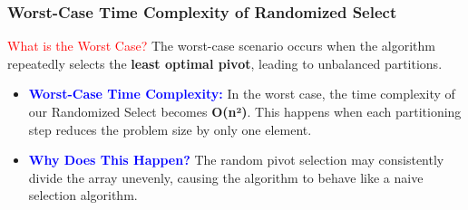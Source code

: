 \begin{frame}
    \frametitle{Worst-Case Time Complexity of Randomized Select}
    \vspace{0.4cm} %

    \begin{block}{\textcolor{red}{What is the Worst Case?}}
        The worst-case scenario occurs when the algorithm repeatedly selects the \textbf{least optimal pivot}, leading to unbalanced partitions.
    \end{block}
    \vspace{0.4cm} %

    \begin{itemize}
        \item \textbf{\textcolor{blue}{Worst-Case Time Complexity:}} 
        In the worst case, the time complexity of our Randomized Select becomes \textbf{O(n²)}. This happens when each partitioning step reduces the problem size by only one element.
        \vspace{0.3cm} %
        
        \item \textbf{\textcolor{blue}{Why Does This Happen?}} 
        The random pivot selection may consistently divide the array unevenly, causing the algorithm to behave like a naive selection algorithm.
    \end{itemize}
    
    \vspace{0.5cm} %
\end{frame}


